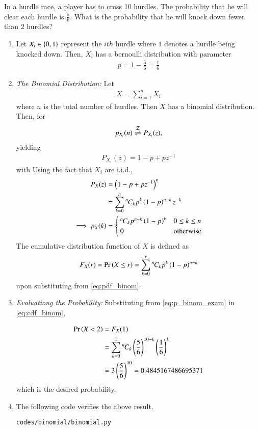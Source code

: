 In a hurdle race, a player has to cross 10 hurdles. The probability that he will
clear each hurdle is $\frac{5}{6}$. What is the probability that he will knock down fewer than 2 hurdles?
\renewcommand{\theequation}{\theenumi}
\renewcommand{\thefigure}{\theenumi}
\begin{enumerate}[label=\thesubsection.\arabic*.,ref=\thesubsection.\theenumi]
%
%
\item  Let $X_i \in \left\{0,1\right\}$ represent the $ith$ hurdle where $1$ denotes a hurdle being knocked down.  Then, $X_i$ has a bernoulli distribution with parameter
\begin{align}
p = 1-\frac{5}{6} = \frac{1}{6}
\label{eq:p_binom_exam}
\end{align}

\item {\em The Binomial Distribution: } Let
\begin{align}
\label{eq:bern_binom}
X = \sum_{i=1}^{n}X_i
\end{align}
%
where $n$ is the total number of hurdles.
Then $X$ has a binomial distribution.  Then, for 
\begin{align}
p_{X_i}(n) \overset{\mathcal{Z}}{ \rightleftharpoons} P_{X_i}(z),
\end{align}
yielding
\begin{align}
 P_{X_i}(z) = 1-p + pz^{-1}
\end{align}
 with
%
Using the fact that $X_i$ are i.i.d.,
\begin{align}
\label{eq:ztrans_binom}
 P_{X}(z) &= \left(1-p + pz^{-1}\right)^n
\\
&= \sum_{k=0}^{n}{{}^{n}\mkern-1muC_{k}}p^{k}\left(1-p\right)^{n-k}z^{-k}
\\
\implies p_{X}(k) &= 
\begin{cases}
{{}^{n}\mkern-1muC_{k}}p^{n-k}\left(1-p\right)^k & 0 \le k \le n
\\
0 & \text{otherwise}
\end{cases}
\label{eq:pdf_binom}
\end{align}
%
The cumulative distribution function of $X$ is defined as
\begin{align}
F_{X}(r) = \Pr\left(X\le r\right) = \sum_{k=0}^{r}{{}^{n}\mkern-1muC_{k}}p^{k}\left(1-p\right)^{n-k}
\label{eq:cdf_binom}
\end{align}
%
upon substituting from \eqref{eq:pdf_binom}.

\item {\em Evaluationg the Probability: }Substituting from \eqref{eq:p_binom_exam} in \eqref{eq:cdf_binom},

\begin {align}
\Pr\left(X < 2\right) &= F_{X}(1)
\\
&=\sum_{k=0}^{1}{{}^{n}\mkern-1muC_{k}}\left(\frac{5}{6}\right)^{10-k}\left(\frac{1}{6}\right)^k
\\
&=3\left(\frac{5}{6}\right)^{10} = 0.4845167486695371 
\label{eq:bern_binom_ans}
\end{align}
%
which is the desired probability.
%
\item The following code verifies the above result.
\begin{lstlisting}
codes/binomial/binomial.py
\end{lstlisting}
\end{enumerate}
